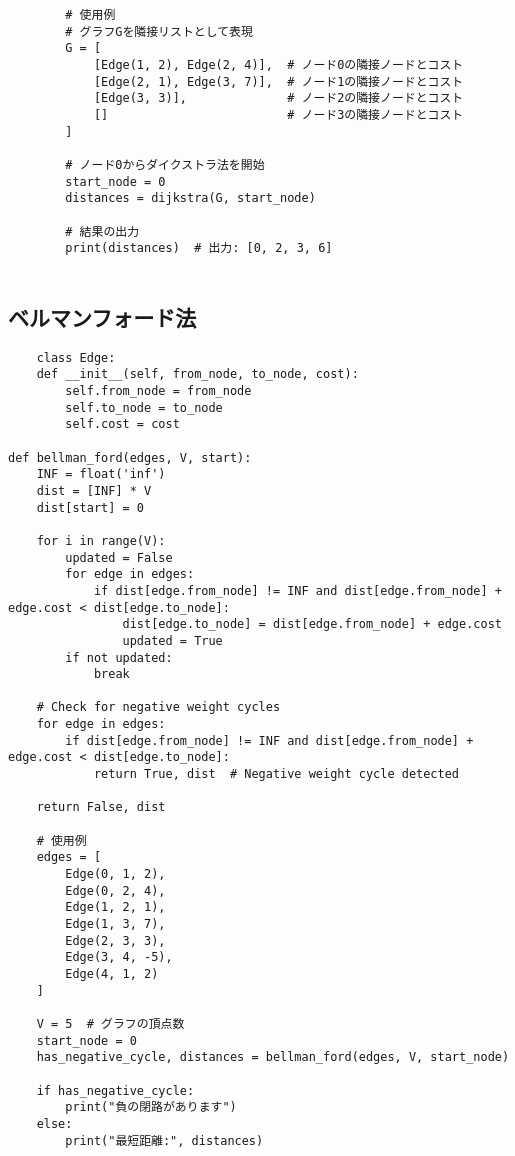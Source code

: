 \documentclass[a4paper, landscape, 9pt]{jarticle} %
\begin{document}
\begin{multicols*}{3}
\begin{lstlisting}
        # 使用例
        # グラフGを隣接リストとして表現
        G = [
            [Edge(1, 2), Edge(2, 4)],  # ノード0の隣接ノードとコスト
            [Edge(2, 1), Edge(3, 7)],  # ノード1の隣接ノードとコスト
            [Edge(3, 3)],              # ノード2の隣接ノードとコスト
            []                         # ノード3の隣接ノードとコスト
        ]
        
        # ノード0からダイクストラ法を開始
        start_node = 0
        distances = dijkstra(G, start_node)
        
        # 結果の出力
        print(distances)  # 出力: [0, 2, 3, 6]
        
    \end{lstlisting}

    \subsection{ベルマンフォード法}
    \begin{lstlisting}
    class Edge:
    def __init__(self, from_node, to_node, cost):
        self.from_node = from_node
        self.to_node = to_node
        self.cost = cost

def bellman_ford(edges, V, start):
    INF = float('inf')
    dist = [INF] * V
    dist[start] = 0

    for i in range(V):
        updated = False
        for edge in edges:
            if dist[edge.from_node] != INF and dist[edge.from_node] + edge.cost < dist[edge.to_node]:
                dist[edge.to_node] = dist[edge.from_node] + edge.cost
                updated = True
        if not updated:
            break

    # Check for negative weight cycles
    for edge in edges:
        if dist[edge.from_node] != INF and dist[edge.from_node] + edge.cost < dist[edge.to_node]:
            return True, dist  # Negative weight cycle detected

    return False, dist
    
    # 使用例
    edges = [
        Edge(0, 1, 2),
        Edge(0, 2, 4),
        Edge(1, 2, 1),
        Edge(1, 3, 7),
        Edge(2, 3, 3),
        Edge(3, 4, -5),
        Edge(4, 1, 2)
    ]
    
    V = 5  # グラフの頂点数
    start_node = 0
    has_negative_cycle, distances = bellman_ford(edges, V, start_node)
    
    if has_negative_cycle:
        print("負の閉路があります")
    else:
        print("最短距離:", distances)
    

\end{lstlisting}
\end{multicols*}
\end{document}

